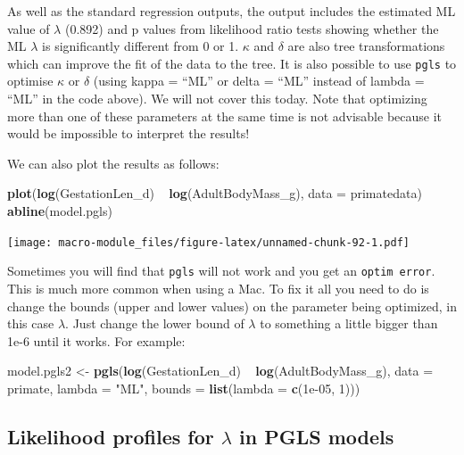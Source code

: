 \documentclass[]{book}
\newenvironment{Shaded}{\begin{snugshade}}{\end{snugshade}}
\newcommand{\KeywordTok}[1]{\textcolor[rgb]{0.13,0.29,0.53}{\textbf{{#1}}}}
\newcommand{\DataTypeTok}[1]{\textcolor[rgb]{0.13,0.29,0.53}{{#1}}}
\newcommand{\DecValTok}[1]{\textcolor[rgb]{0.00,0.00,0.81}{{#1}}}
\newcommand{\FloatTok}[1]{\textcolor[rgb]{0.00,0.00,0.81}{{#1}}}
\newcommand{\StringTok}[1]{\textcolor[rgb]{0.31,0.60,0.02}{{#1}}}
\newcommand{\NormalTok}[1]{{#1}}
\begin{document}
As well as the standard regression outputs, the output includes the
estimated ML value of \(\lambda\) (0.892) and p values from likelihood
ratio tests showing whether the ML \(\lambda\) is significantly
different from 0 or 1. \(\kappa\) and \(\delta\) are also tree
transformations which can improve the fit of the data to the tree. It is
also possible to use \texttt{pgls} to optimise \(\kappa\) or \(\delta\)
(using kappa = ``ML'' or delta = ``ML'' instead of lambda = ``ML'' in
the code above). We will not cover this today. Note that optimizing more
than one of these parameters at the same time is not advisable because
it would be impossible to interpret the results!

We can also plot the results as follows:

\begin{Shaded}
\begin{Highlighting}[]
\KeywordTok{plot}\NormalTok{(}\KeywordTok{log}\NormalTok{(GestationLen_d) ~}\StringTok{ }\KeywordTok{log}\NormalTok{(AdultBodyMass_g), }\DataTypeTok{data =} \NormalTok{primatedata)}
\KeywordTok{abline}\NormalTok{(model.pgls)}
\end{Highlighting}
\end{Shaded}

\texttt{[image: macro-module\_files/figure-latex/unnamed-chunk-92-1.pdf]}

Sometimes you will find that \texttt{pgls} will not work and you get an
\texttt{optim\ error}. This is much more common when using a Mac. To fix
it all you need to do is change the bounds (upper and lower values) on
the parameter being optimized, in this case \(\lambda\). Just change the
lower bound of \(\lambda\) to something a little bigger than 1e-6 until
it works. For example:

\begin{Shaded}
\begin{Highlighting}[]
\NormalTok{model.pgls2 <-}\StringTok{ }\KeywordTok{pgls}\NormalTok{(}\KeywordTok{log}\NormalTok{(GestationLen_d) ~}\StringTok{ }\KeywordTok{log}\NormalTok{(AdultBodyMass_g), }\DataTypeTok{data =} \NormalTok{primate, }\DataTypeTok{lambda =} \StringTok{"ML"}\NormalTok{, }\DataTypeTok{bounds =} \KeywordTok{list}\NormalTok{(}\DataTypeTok{lambda =} \KeywordTok{c}\NormalTok{(}\FloatTok{1e-05}\NormalTok{, }\DecValTok{1}\NormalTok{)))}
\end{Highlighting}
\end{Shaded}

\subsection{\texorpdfstring{Likelihood profiles for \(\lambda\) in PGLS
models}{Likelihood profiles for \textbackslash{}lambda in PGLS models}}\label{likelihood-profiles-for-lambda-in-pgls-models}
\end{document}
